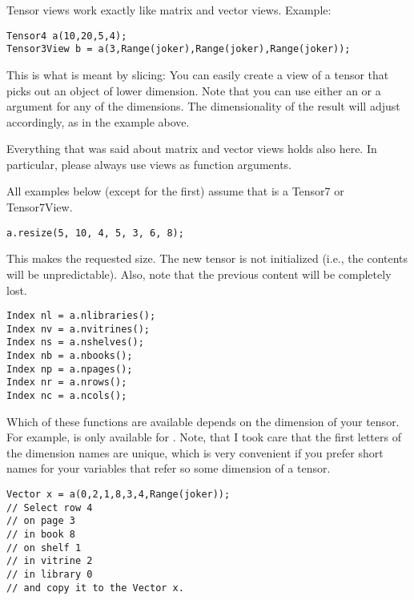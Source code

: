 
Tensor views work exactly like matrix and vector views. Example:

\begin{verbatim}
Tensor4 a(10,20,5,4);
Tensor3View b = a(3,Range(joker),Range(joker),Range(joker));
\end{verbatim}

This is what is meant by slicing: You can easily create a
view of a tensor that picks out an object of lower dimension. Note
that you can use either an  or a  argument for
any of the dimensions. The dimensionality of the result will adjust
accordingly, as in the example above.

Everything that was said about matrix and vector views holds also
here. In particular, please always use views as function arguments. 


All examples below (except for the first) assume that  is a
Tensor7 or Tensor7View.

\begin{verbatim}
a.resize(5, 10, 4, 5, 3, 6, 8);
\end{verbatim}
This makes  the requested size. The new tensor is not
initialized (i.e., the contents will be unpredictable). Also, note
that the previous content will be completely lost.

\begin{verbatim}
Index nl = a.nlibraries();
Index nv = a.nvitrines();
Index ns = a.nshelves();
Index nb = a.nbooks();
Index np = a.npages();
Index nr = a.nrows();
Index nc = a.ncols();
\end{verbatim}

Which of these functions are available depends on the dimension of
your tensor. For example,  is only available for
. Note, that I took care that the first letters of the
dimension names are unique, which is very convenient if you prefer short
names for your variables that refer so some dimension of a tensor.

\begin{verbatim}
Vector x = a(0,2,1,8,3,4,Range(joker));
// Select row 4
// on page 3 
// in book 8 
// on shelf 1 
// in vitrine 2 
// in library 0
// and copy it to the Vector x.
\end{verbatim}


